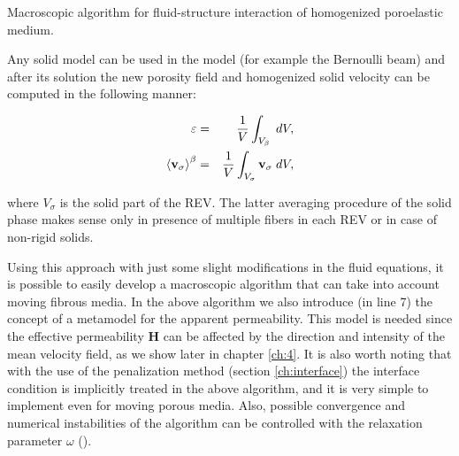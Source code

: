 \begin{algorithm}[H]
	\caption{Macroscopic algorithm for fluid-structure interaction of homogenized poroelastic medium.}
	\label{algo:vans_elastic}
\end{algorithm}

\vspace{0.5cm}
Any solid model can be used in the model (for example the Bernoulli beam) and after its solution the new porosity field and homogenized solid velocity can be computed in the following manner:


\begin{eqnarray}
	\varepsilon &=& \dfrac{1}{V} \int_{V_\beta} \; dV,  \nonumber \\
{\left< \textbf{v}_{\sigma} \right>}^{\beta} &=& \dfrac{1}{V} \int_{V_{\sigma}} \textbf{v}_{\sigma} \; dV, \nonumber 
\end{eqnarray}

\noindent where $V_{\sigma}$ is the solid part of the REV.
The latter averaging procedure of the solid phase makes sense only in presence of multiple fibers in each REV or in case of non-rigid solids.

Using this approach with just some slight modifications in the fluid equations, it is possible to easily develop a macroscopic algorithm that can take into account moving fibrous media.
In the above algorithm we also introduce (in line 7) the concept of a metamodel for the apparent permeability. This model is needed since the effective permeability $\mathbf{H}$ can be affected by the direction and intensity of the mean velocity field, as we show later in chapter \ref{ch:4}.
It is also worth noting that with the use of the penalization method (section \ref{ch:interface}) the interface condition is implicitly treated in the above algorithm, and it is very simple to implement even for moving porous media.
Also, possible convergence and numerical instabilities of the algorithm can be controlled with the relaxation parameter $\omega$ (\citet{irons1969aitken}).

